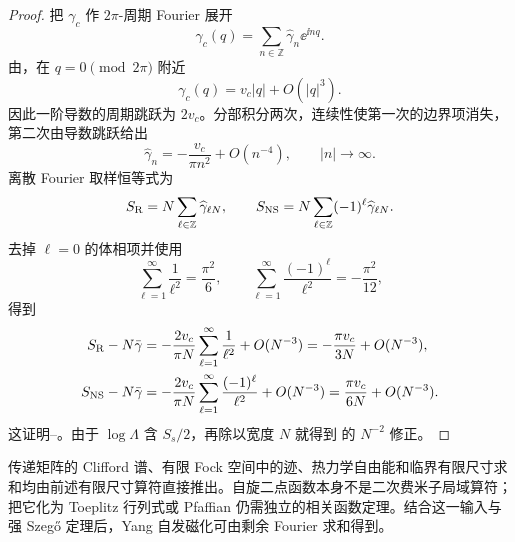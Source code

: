 \begin{proof}
把 \(\gamma_c\) 作 \(2\pi\)-周期 Fourier 展开
\[
 \gamma_c(q)=\sum_{n\in\mathbb Z}
 \widehat\gamma_n\ee^{\ii nq}.
\]
由，在 \(q=0\pmod{2\pi}\) 附近
\[
 \gamma_c(q)=v_c|q|+O(|q|^3).
\]
因此一阶导数的周期跳跃为 \(2v_c\)。分部积分两次，连续性使第一次的边界项消失，第二次由导数跳跃给出
\begin{equation}
 \widehat\gamma_n
 =-\frac{v_c}{\pi n^2}+O(n^{-4}),
 \qquad |n|\to\infty.
 \label{eq:phys-sm-critical-gamma-fourier-tail}
\end{equation}
离散 Fourier 取样恒等式为
\[
 S_{\rm R}=N\sum_{\ell\in\mathbb Z}
 \widehat\gamma_{\ell N},
 \qquad
 S_{\rm NS}=N\sum_{\ell\in\mathbb Z}
 (-1)^\ell\widehat\gamma_{\ell N}.
\]
去掉 \(\ell=0\) 的体相项并使用
\[
 \sum_{\ell=1}^\infty\frac1{\ell^2}=\frac{\pi^2}{6},
 \qquad
 \sum_{\ell=1}^\infty\frac{(-1)^\ell}{\ell^2}=-\frac{\pi^2}{12},
\]
得到
\[
 \begin{aligned}
 S_{\rm R}-N\bar\gamma
 &=-\frac{2v_c}{\pi N}
 \sum_{\ell=1}^\infty\frac1{\ell^2}
 +O(N^{-3})
 =-\frac{\pi v_c}{3N}+O(N^{-3}),\\
 S_{\rm NS}-N\bar\gamma
 &=-\frac{2v_c}{\pi N}
 \sum_{\ell=1}^\infty\frac{(-1)^\ell}{\ell^2}
 +O(N^{-3})
 =\frac{\pi v_c}{6N}+O(N^{-3}).
 \end{aligned}
\]
这证明--。由于 \(\log\Lambda\) 含 \(S_s/2\)，再除以宽度 \(N\) 就得到 的 \(N^{-2}\) 修正。
\end{proof}

传递矩阵的 Clifford 谱、有限 Fock 空间中的迹、热力学自由能和临界有限尺寸求和均由前述有限尺寸算符直接推出。自旋二点函数本身不是二次费米子局域算符；把它化为 Toeplitz 行列式或 Pfaffian 仍需独立的相关函数定理。结合这一输入与强 Szegő 定理后，Yang 自发磁化可由剩余 Fourier 求和得到。

